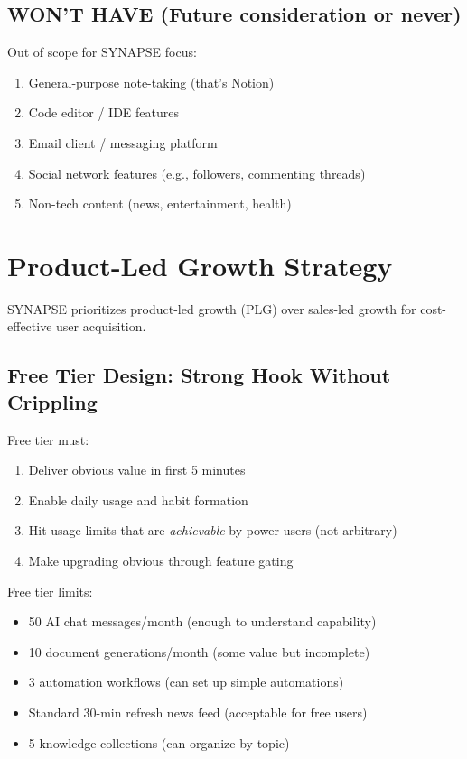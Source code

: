 \documentclass{report}
\begin{document}
\subsection{WON'T HAVE (Future consideration or never)}

Out of scope for SYNAPSE focus:

\begin{enumerate}
    \item General-purpose note-taking (that's Notion)
    \item Code editor / IDE features
    \item Email client / messaging platform
    \item Social network features (e.g., followers, commenting threads)
    \item Non-tech content (news, entertainment, health)
\end{enumerate}

\section{Product-Led Growth Strategy}

SYNAPSE prioritizes product-led growth (PLG) over sales-led growth for cost-effective user acquisition.

\subsection{Free Tier Design: Strong Hook Without Crippling}

Free tier must:
\begin{enumerate}
    \item Deliver obvious value in first 5 minutes
    \item Enable daily usage and habit formation
    \item Hit usage limits that are \textit{achievable} by power users (not arbitrary)
    \item Make upgrading obvious through feature gating
\end{enumerate}

Free tier limits:
\begin{itemize}
    \item 50 AI chat messages/month (enough to understand capability)
    \item 10 document generations/month (some value but incomplete)
    \item 3 automation workflows (can set up simple automations)
    \item Standard 30-min refresh news feed (acceptable for free users)
    \item 5 knowledge collections (can organize by topic)
\end{itemize}
\end{document}
